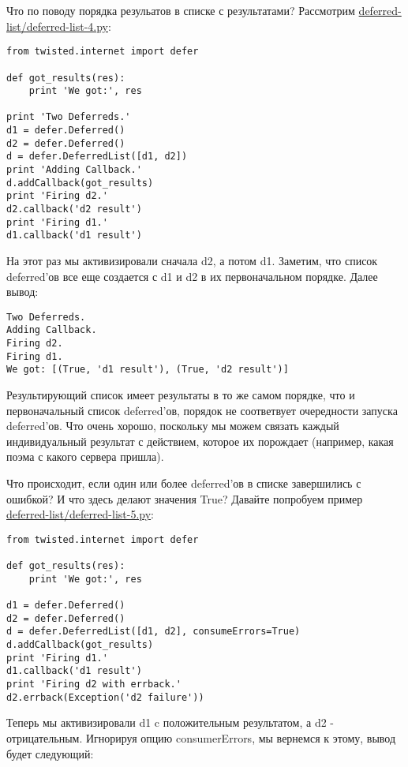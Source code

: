 Что по поводу порядка резульатов в списке с результатами? 
Рассмотрим \href{http://github.com/jdavisp3/twisted-intro/blob/master/deferred-list/deferred-list-4.py#L1}{deferred-list/deferred-list-4.py}:

 \begin{verbatim}
from twisted.internet import defer

def got_results(res):
    print 'We got:', res

print 'Two Deferreds.'
d1 = defer.Deferred()
d2 = defer.Deferred()
d = defer.DeferredList([d1, d2])
print 'Adding Callback.'
d.addCallback(got_results)
print 'Firing d2.'
d2.callback('d2 result')
print 'Firing d1.'
d1.callback('d1 result')
\end{verbatim} 

На этот раз мы активизировали сначала d2, а потом d1. Заметим, что 
список deferred'ов все еще создается с d1 и d2 в их 
первоначальном порядке. Далее вывод:

 \begin{verbatim}
Two Deferreds.
Adding Callback.
Firing d2.
Firing d1.
We got: [(True, 'd1 result'), (True, 'd2 result')]
\end{verbatim} 


Результирующий список имеет результаты в то же самом порядке, что и 
первоначальный список deferred'ов, порядок не соответвует 
очередности запуска deferred'ов. Что очень хорошо, поскольку 
мы можем связать каждый индивидуальный результат с 
действием, которое их порождает (например, какая поэма с какого сервера пришла).


Что происходит, если один или более deferred'ов в списке 
завершились с ошибкой? И что здесь делают значения True? 
Давайте попробуем пример \href{http://github.com/jdavisp3/twisted-intro/blob/master/deferred-list/deferred-list-5.py#L1}{deferred-list/deferred-list-5.py}:

 \begin{verbatim}
from twisted.internet import defer

def got_results(res):
    print 'We got:', res

d1 = defer.Deferred()
d2 = defer.Deferred()
d = defer.DeferredList([d1, d2], consumeErrors=True)
d.addCallback(got_results)
print 'Firing d1.'
d1.callback('d1 result')
print 'Firing d2 with errback.'
d2.errback(Exception('d2 failure'))
\end{verbatim} 

Теперь мы активизировали d1 c положительным результатом, а 
d2 - отрицательным. Игнорируя опцию consumerErrors, 
мы вернемся к этому, вывод будет следующий:


